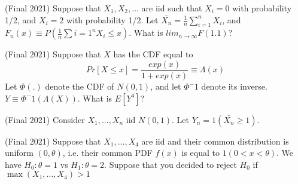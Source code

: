 \documentclass[answers]{exam}
\begin{document}
\begin{questions}
\question (Final 2021) Suppose that $X_1,X_2,...$ are iid such that $X_i = 0$ with probability 1/2, and $X_i = 2$ with probability 1/2. Let $\bar{X_n} = \frac{1}{n} \sum_{i=1}^n X_i$, and $F_n(x) \equiv P(\frac{1}{n}\sum{i=1}^n X_i \leq x)$. What is $lim_{n \to \infty} F(1.1)$?
\begin{solution}
\end{solution}

\question (Final 2021) Suppose that $X$ has the CDF equal to
$$Pr[X \leq x] = \frac{exp(x)}{1+exp(x)} \equiv \Lambda(x)$$
Let $\Phi(.)$ denote the CDF of $N(0,1)$, and let $\Phi^-1$ denote its inverse. $Y \equiv \Phi^-1(\Lambda(X))$. What is $E[Y^4]$?
\begin{solution}
\end{solution}

\question (Final 2021) Consider $X_1,...,X_n$ iid $N(0,1)$. Let $Y_n = 1(\bar{X_n}\geq 1)$.

\question (Final 2021) Suppose that $X_1,...,X_4$ are iid and their common distribution is uniform $(0,\theta)$, i.e. their common PDF $f(x)$ is equal to $1(0<x<\theta)$. We have $H_0: \theta = 1$ vs $H_1 : \theta = 2$. Suppose that you decided to reject $H_0$ if $\max(X_1,...,X_4)>1$
\end{questions}
\end{document}
